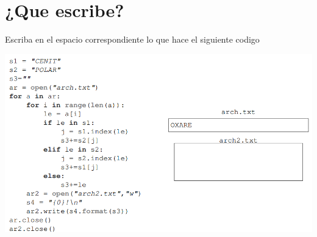 \section{¿Que escribe?}

Escriba en el espacio correspondiente lo que hace el siguiente codigo

\begin{center}
	\includegraphics[scale=0.65]{Imagenes/p1}
\end{center}
